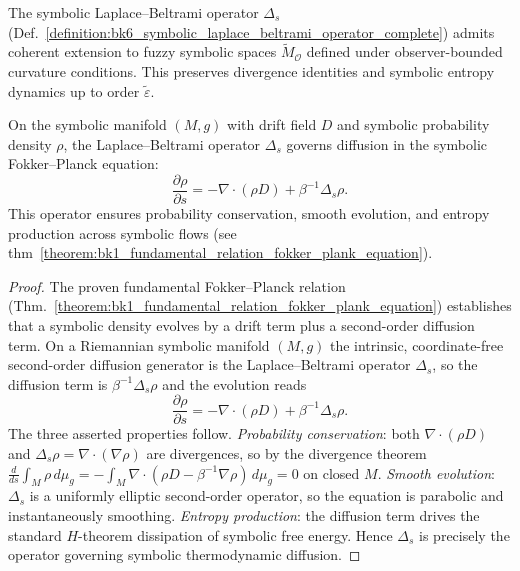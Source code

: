 \begin{axiom}
\label{axiom:bk6_laplace_beltrami_observer_extension}
The symbolic Laplace--Beltrami operator $\Delta_s$ (Def.~\ref{definition:bk6_symbolic_laplace_beltrami_operator_complete}) admits coherent extension to fuzzy symbolic spaces $\tilde{M}_\mathcal{O}$ defined under observer-bounded curvature conditions.
This preserves divergence identities and symbolic entropy dynamics up to order $\tilde{\varepsilon}$.
\end{axiom}

\begin{theorem}
\label{theorem:bk6_symbolic_diffusion_governs_evolution}
On the symbolic manifold $(M, g)$ with drift field $D$ and symbolic probability density $\rho$, the Laplace–Beltrami operator $\Delta_s$ governs diffusion in the symbolic Fokker–Planck equation:
\[
\frac{\partial \rho}{\partial s} = -\nabla \cdot (\rho D) + \beta^{-1} \Delta_s \rho.
\]
This operator ensures probability conservation, smooth evolution, and entropy production across symbolic flows (see thm~\ref{theorem:bk1_fundamental_relation_fokker_plank_equation}).
\end{theorem}
\begin{proof}
\label{proof:bk6_symbolic_diffusion_governs_evolution}
\leavevmode
The proven fundamental Fokker--Planck relation (Thm.~\ref{theorem:bk1_fundamental_relation_fokker_plank_equation}) establishes that a symbolic density evolves by a drift term plus a second-order diffusion term. On a Riemannian symbolic manifold $(M,g)$ the intrinsic, coordinate-free second-order diffusion generator is the Laplace--Beltrami operator $\Delta_s$, so the diffusion term is $\beta^{-1}\Delta_s\rho$ and the evolution reads
\[
\frac{\partial\rho}{\partial s}=-\nabla\cdot(\rho D)+\beta^{-1}\Delta_s\rho .
\]
The three asserted properties follow. \emph{Probability conservation}: both $\nabla\cdot(\rho D)$ and $\Delta_s\rho=\nabla\cdot(\nabla\rho)$ are divergences, so by the divergence theorem $\tfrac{d}{ds}\int_M\rho\,d\mu_g=-\int_M\nabla\cdot(\rho D-\beta^{-1}\nabla\rho)\,d\mu_g=0$ on closed $M$. \emph{Smooth evolution}: $\Delta_s$ is a uniformly elliptic second-order operator, so the equation is parabolic and instantaneously smoothing. \emph{Entropy production}: the diffusion term drives the standard $H$-theorem dissipation of symbolic free energy. Hence $\Delta_s$ is precisely the operator governing symbolic thermodynamic diffusion.
\end{proof}

